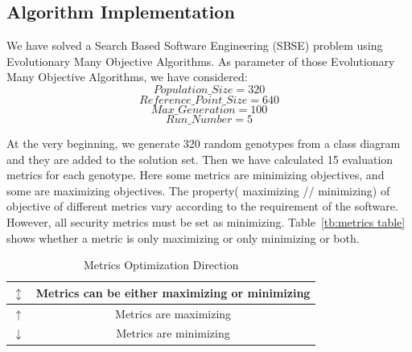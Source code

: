 \documentclass[letterpaper, 10 pt, conference]{ieeeconf}  %
\begin{document}
\subsection{Algorithm Implementation}
We have solved a Search Based Software Engineering (SBSE) problem using Evolutionary Many Objective Algorithms.
As parameter of those Evolutionary Many Objective Algorithms, we have considered:
\begin{equation}\label{population_size}
Population\_Size=320
\end{equation}
\begin{equation}\label{ref_point}
Reference\_Point\_Size=640
\end{equation}
\begin{equation} \label{max_gen}
Max\_Generation=100
\end{equation}
\begin{equation} \label{run_num}
Run\_Number=5
\end{equation}



At the very beginning, we generate 320 random genotypes from a class diagram and they are added to the solution set. Then we have calculated 15 evaluation metrics for each genotype. Here some metrics are minimizing objectives, and some are maximizing objectives. The property( maximizing // minimizing) of objective of different metrics vary according to the requirement of the software. However, all security metrics must be set as minimizing. Table~\ref{tb:metrics table} shows whether a metric is only maximizing or only minimizing or both. 
\begin{table}[!h]
    \centering
    \caption{Metrics Optimization Direction}
    \begin{tabular}{|c|c|}
    \hline
        $\updownarrow$ &  Metrics can be either maximizing or minimizing \\ \hline
        $\uparrow$ & Metrics are maximizing \\ \hline
        $\downarrow$ & Metrics are minimizing \\ 
        \hline
    \end{tabular}
    
    \label{table_metrics_optimization}
\end{table}
\end{document}

